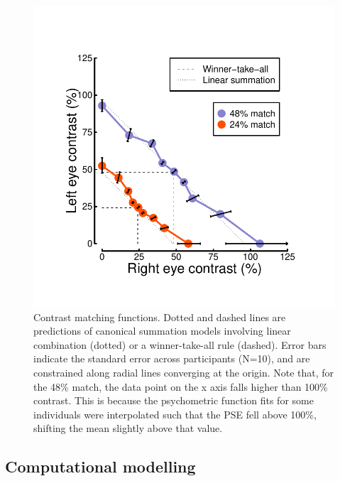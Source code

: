 \documentclass[
]{article}
\begin{document}
\begin{figure}

{\centering \includegraphics[width=0.5\linewidth]{Figures/matchingdata} 

}

\caption{Contrast matching functions. Dotted and dashed lines are predictions of canonical summation models involving linear combination (dotted) or a winner-take-all rule (dashed). Error bars indicate the standard error across participants (N=10), and are constrained along radial lines converging at the origin. Note that, for the {48\%} match, the data point on the x axis falls higher than {100\%} contrast. This is because the psychometric function fits for some individuals were interpolated such that the PSE fell above {100\%}, shifting the mean slightly above that value.}\label{fig:matchingdata}
\end{figure}

\hypertarget{computational-modelling}{%
\subsection{Computational modelling}\label{computational-modelling}}
\end{document}

